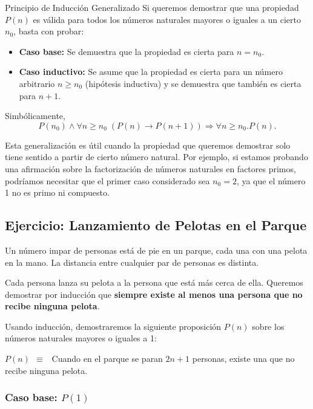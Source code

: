 \begin{definitionblock}{Principio de Inducción Generalizado}
Si queremos demostrar que una propiedad $P(n)$ es válida para todos los números naturales mayores o iguales a un cierto $n_0$, basta con probar:
\begin{itemize}
    \item \textbf{Caso base:} Se demuestra que la propiedad es cierta para $n = n_0$.
    \item \textbf{Caso inductivo:} Se asume que la propiedad es cierta para un número arbitrario $n \geq n_0$ (hipótesis inductiva) y se demuestra que también es cierta para $n+1$.
\end{itemize}

Simbólicamente,
$$ P(n_0) \wedge \forall n \geq n_0 \; (P(n) \rightarrow P(n+1)) \Rightarrow \forall n \geq n_0. P(n). $$
\end{definitionblock}

Esta generalización es útil cuando la propiedad que queremos demostrar solo tiene sentido a partir de cierto número natural. Por ejemplo, si estamos probando una afirmación sobre la factorización de números naturales en factores primos, podríamos necesitar que el primer caso considerado sea $n_0 = 2$, ya que el número 1 no es primo ni compuesto.

\subsection*{Ejercicio: Lanzamiento de Pelotas en el Parque}
Un número impar de personas está de pie en un parque, cada una con una pelota en la mano. La distancia entre cualquier par de personas es distinta.

Cada persona lanza su pelota a la persona que está más cerca de ella. Queremos demostrar por inducción que \textbf{siempre existe al menos una persona que no recibe ninguna pelota}.

\medskip

Usando inducción, demostraremos la siguiente proposición \( P(n) \) sobre los números naturales mayores o iguales a 1:

\medskip

\begin{center}
  \( P(n) ~~\equiv~~ \)  Cuando en el parque se paran \( 2n+1 \) personas, existe una que no recibe ninguna pelota.
\end{center}

\subsubsection*{Caso base: \( P(1) \)}

